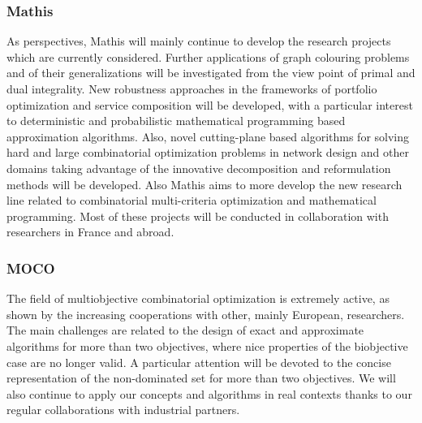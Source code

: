 \subsubsection{Mathis}
 As perspectives, Mathis will mainly continue to develop the research projects which are currently considered. Further applications of graph colouring problems and of their generalizations will be investigated from the view point of primal and 
dual integrality. New robustness approaches in the frameworks of portfolio optimization and service composition will be developed, with a particular interest to deterministic and probabilistic mathematical programming based approximation algorithms. Also, novel cutting-plane based algorithms for solving hard and large combinatorial optimization problems in network design and other domains taking advantage of the innovative decomposition and reformulation methods will be developed. Also Mathis aims to more develop the new research line related to combinatorial multi-criteria optimization and mathematical programming.
Most of these projects will be conducted in collaboration with researchers in France and abroad.\\

\subsubsection{MOCO}
 The field of multiobjective combinatorial optimization is extremely active, as shown by the increasing cooperations with other, mainly European, researchers.
The main challenges are related to the design of exact and approximate algorithms for more than two objectives, where nice properties of the biobjective case are no longer valid.
A particular attention will be devoted to the concise representation of the non-dominated set for more than two objectives. We will also continue to apply our concepts and algorithms
in real contexts thanks to our regular collaborations with industrial partners.
